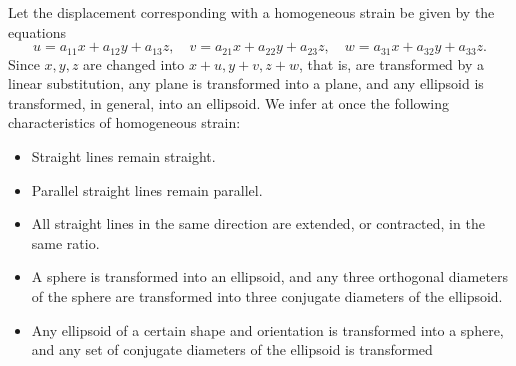 Let the displacement corresponding with a homogeneous strain be given by the
equations
\[
u=a_{11} x+a_{12} y+a_{13} z, \quad v=a_{21} x+a_{22} y+a_{23} z, \quad
w=a_{31} x+a_{32} y+a_{33} z .
\]
Since \(x, y, z\) are changed into \(x+u, y+v, z+w\), that is, are transformed
by a linear substitution, any plane is transformed into a plane, and any
ellipsoid is transformed, in general, into an ellipsoid. We infer at once the
following characteristics of homogeneous strain: 
\begin{itemize}
\item[(i)] Straight lines remain straight. 
\item[(ii)] Parallel straight lines remain parallel. 
\item[(iii)] All straight lines in the same direction are extended, or
contracted, in the same ratio. 
\item[(iv)] A sphere is transformed into an ellipsoid, and any three orthogonal
diameters of the sphere are transformed into three conjugate diameters of the
ellipsoid. 
\item[(v)] Any ellipsoid of a certain shape and orientation is transformed into
a sphere, and any set of conjugate diameters of the ellipsoid is transformed
\end{itemize}
